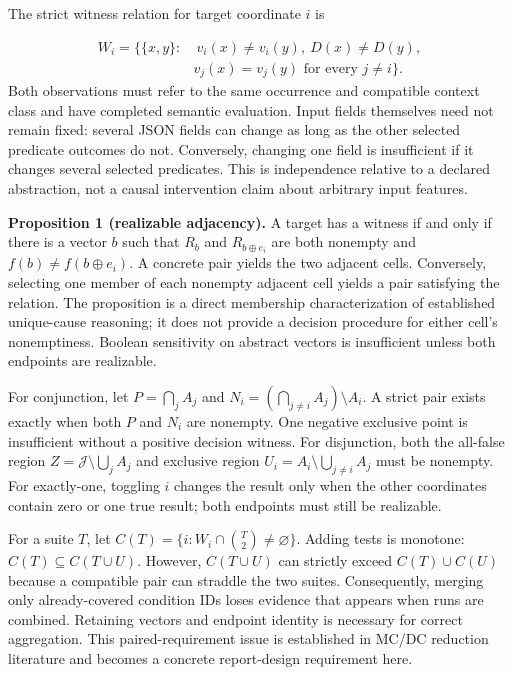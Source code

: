\documentclass[sigconf,nonacm]{acmart}
\begin{document}
The strict witness relation for target coordinate $i$ is

\[
\begin{aligned}
W_i=\{\{x,y\}:&\ v_i(x)\ne v_i(y),\ D(x)\ne D(y),\\
&v_j(x)=v_j(y)\text{ for every }j\ne i\}.
\end{aligned}
\]
Both observations must refer to the same occurrence and compatible context class and have completed semantic evaluation. Input fields themselves need not remain fixed: several JSON fields can change as long as the other selected predicate outcomes do not. Conversely, changing one field is insufficient if it changes several selected predicates. This is independence relative to a declared abstraction, not a causal intervention claim about arbitrary input features.

\textbf{Proposition 1 (realizable adjacency).} A target has a witness if and only if there is a vector $b$ such that $R_b$ and $R_{b\oplus e_i}$ are both nonempty and $f(b)\ne f(b\oplus e_i)$. A concrete pair yields the two adjacent cells. Conversely, selecting one member of each nonempty adjacent cell yields a pair satisfying the relation. The proposition is a direct membership characterization of established unique-cause reasoning; it does not provide a decision procedure for either cell's nonemptiness. Boolean sensitivity on abstract vectors is insufficient unless both endpoints are realizable. \cite{ref1,ref3}

For conjunction, let $P=\bigcap_j A_j$ and $N_i=(\bigcap_{j\ne i}A_j)\setminus A_i$. A strict pair exists exactly when both $P$ and $N_i$ are nonempty. One negative exclusive point is insufficient without a positive decision witness. For disjunction, both the all-false region $Z=\mathcal{J}\setminus\bigcup_j A_j$ and exclusive region $U_i=A_i\setminus\bigcup_{j\ne i}A_j$ must be nonempty. For exactly-one, toggling $i$ changes the result only when the other coordinates contain zero or one true result; both endpoints must still be realizable.

For a suite $T$, let $C(T)=\{i:W_i\cap {T\choose2}\ne\varnothing\}$. Adding tests is monotone: $C(T)\subseteq C(T\cup U)$. However, $C(T\cup U)$ can strictly exceed $C(T)\cup C(U)$ because a compatible pair can straddle the two suites. Consequently, merging only already-covered condition IDs loses evidence that appears when runs are combined. Retaining vectors and endpoint identity is necessary for correct aggregation. This paired-requirement issue is established in MC/DC reduction literature and becomes a concrete report-design requirement here. \cite{ref2}
\end{document}
